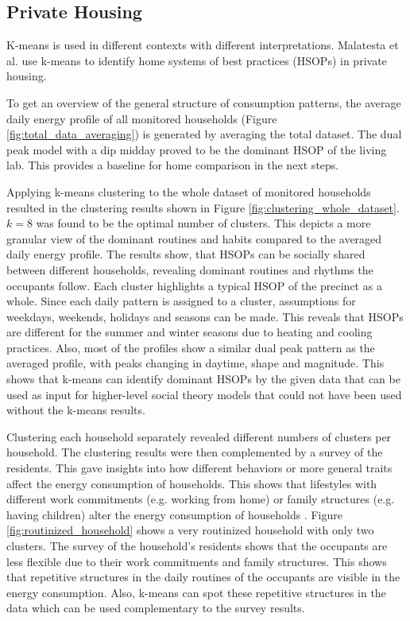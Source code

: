 \subsection{Private Housing}
K-means is used in different contexts with different interpretations.
Malatesta et al. \cite{MAL-HBP} use k-means to identify home systems of best practices (HSOPs) in private housing.

To get an overview of the general structure of consumption patterns, the average daily energy profile of all monitored households (Figure \ref{fig:total_data_averaging}) is generated by averaging the total dataset.
The dual peak model with a dip midday proved to be the dominant HSOP of the living lab.
This provides a baseline for home comparison in the next steps.

Applying k-means clustering to the whole dataset of monitored households resulted in the clustering results shown in Figure \ref{fig:clustering_whole_dataset}.
$k=8$ was found to be the optimal number of clusters.
This depicts a more granular view of the dominant routines and habits compared to the averaged daily energy profile.
The results show, that HSOPs can be socially shared between different households, revealing dominant routines and rhythms the occupants follow.
Each cluster highlights a typical HSOP of the precinct as a whole.
Since each daily pattern is assigned to a cluster, assumptions for weekdays, weekends, holidays and seasons can be made. 
This reveals that HSOPs are different for the summer and winter seasons due to heating and cooling practices.
Also, most of the profiles show a similar dual peak pattern as the averaged profile, with peaks changing in daytime, shape and magnitude.
This shows that k-means can identify dominant HSOPs by the given data that can be used as input for higher-level social theory models that could not have been used without the k-means results.

Clustering each household separately revealed different numbers of clusters per household.
The clustering results were then complemented by a survey of the residents.
This gave insights into how different behaviors or more general traits affect the energy consumption of households.
This shows that lifestyles with different work commitments (e.g. working from home) or family structures (e.g. having children) alter the energy consumption of households \cite{KUR-HBP}.
Figure \ref{fig:routinized_household} shows a very routinized household with only two clusters.
The survey of the household's residents shows that the occupants are less flexible due to their work commitments and family structures.
This shows that repetitive structures in the daily routines of the occupants are visible in the energy consumption.
Also, k-means can spot these repetitive structures in the data which can be used complementary to the survey results.

